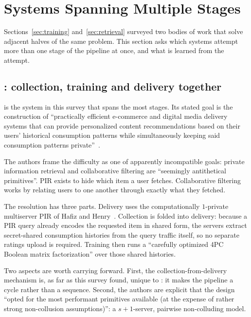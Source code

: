 \section{Systems Spanning Multiple Stages}
\label{sec:both}

Sections~\ref{sec:training} and~\ref{sec:retrieval} surveyed two bodies of work that solve
adjacent halves of the same problem. This section asks which systems attempt more than one stage
of the pipeline at once, and what is learned from the attempt.

\subsection{\pirsonaplain{}: collection, training and delivery together}
\label{sec:both:pirsona}

\pirsona{} is the system in this survey that spans the most stages. Its stated goal is the
construction of ``practically efficient e-commerce and digital media delivery systems that can
provide personalized content recommendations based on their users' historical consumption patterns
while simultaneously keeping said consumption patterns private''~\cite{pirsona2021}.

The authors frame the difficulty as one of apparently incompatible goals: private information
retrieval and collaborative filtering are ``seemingly antithetical primitives''. PIR exists to
hide which item a user fetches. Collaborative filtering works by relating users to one another
through exactly what they fetched.

The resolution has three parts. Delivery uses the computationally $1$-private multiserver PIR of
Hafiz and Henry~\cite{hafiz2019}. Collection is folded into delivery: because a PIR query already
encodes the requested item in shared form, the servers extract secret-shared consumption histories
from the query traffic itself, so no separate ratings upload is required. Training then runs a
``carefully optimized 4PC Boolean matrix factorization'' over those shared histories.

Two aspects are worth carrying forward. First, the collection-from-delivery mechanism is, as far
as this survey found, unique to \pirsonaplain{}: it makes the pipeline a cycle rather than a
sequence. Second, the authors are explicit that the design ``opted for the most performant
primitives available (at the expense of rather strong non-collusion assumptions)'': a
$s{+}1$-server, pairwise non-colluding model.

